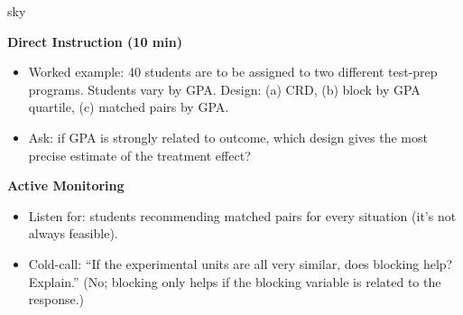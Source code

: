\documentclass[10pt]{article}
\begin{document}
\begin{skillbox}{sky}
\begin{minipage}[t]{0.48\linewidth}
    \textbf{Direct Instruction (10 min)}
    \begin{itemize}
        \item Worked example: 40 students are to be assigned to two different test-prep
              programs. Students vary by GPA. Design: (a) CRD, (b) block by GPA
              quartile, (c) matched pairs by GPA.
        \item Ask: if GPA is strongly related to outcome, which design gives the most
              precise estimate of the treatment effect?
    \end{itemize}
\end{minipage}
\hfill
\begin{minipage}[t]{0.48\linewidth}
    \textbf{Active Monitoring}
    \begin{itemize}
        \item Listen for: students recommending matched pairs for every situation
              (it's not always feasible).
        \item Cold-call: ``If the experimental units are all very similar, does blocking
              help? Explain.'' (No; blocking only helps if the blocking variable is
              related to the response.)
    \end{itemize}
\end{minipage}
\end{skillbox}
\end{document}
